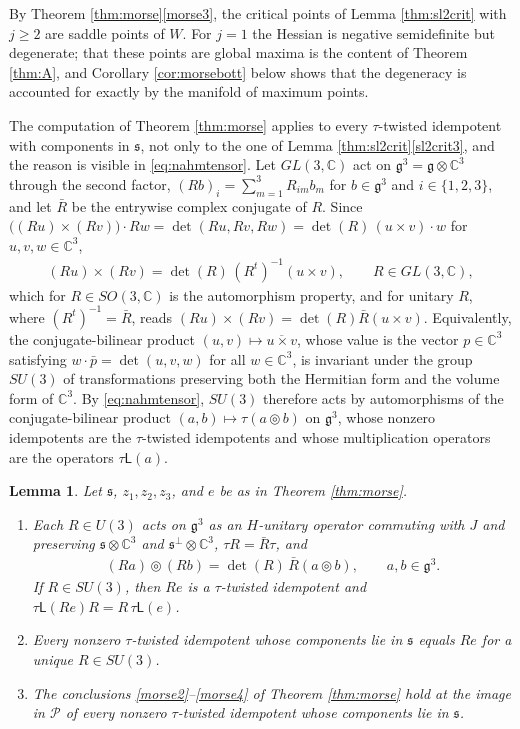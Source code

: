 \documentclass [leqno, 10pt]{amsart}
\newtheorem{lemma}[theorem]{Lemma}%
\theoremstyle{definition}
\numberwithin{equation}{section}
\newcommand{\tmlt}{\circledcirc}
\newcommand{\lin}{\mathsf{L}}
\newcommand{\g}{\mathfrak{g}}
\newcommand{\com}{\mathbb C}
\newcommand{\subs}{\mathfrak{s}}
\begin{document}
By Theorem \ref{thm:morse}\ref{morse3}, the critical points of Lemma \ref{thm:sl2crit} with $j \geq 2$ are saddle points of $W$. For $j = 1$ the Hessian is negative semidefinite but degenerate; that these points are global maxima is the content of Theorem \ref{thm:A}, and Corollary \ref{cor:morsebott} below shows that the degeneracy is accounted for exactly by the manifold of maximum points.

The computation of Theorem \ref{thm:morse} applies to every $\tau$-twisted idempotent with components in $\subs$, not only to the one of Lemma \ref{thm:sl2crit}\ref{sl2crit3}, and the reason is visible in \eqref{eq:nahmtensor}. Let $GL(3, \com)$ act on $\g^{3} = \g \otimes \com^{3}$ through the second factor, $(Rb)_{i} = \sum_{m=1}^{3}R_{im}b_{m}$ for $b \in \g^{3}$ and $i \in \{1, 2, 3\}$, and let $\bar{R}$ be the entrywise complex conjugate of $R$. Since $\big((Ru) \times (Rv)\big) \cdot Rw = \det(Ru, Rv, Rw) = \det(R)\,(u \times v)\cdot w$ for $u, v, w \in \com^{3}$,
\begin{align}\label{eq:crossequivariance}
(Ru) \times (Rv) = \det(R)\,(R^{t})^{-1}(u \times v), \qquad R \in GL(3, \com),
\end{align}
which for $R \in SO(3, \com)$ is the automorphism property, and for unitary $R$, where $(R^{t})^{-1} = \bar{R}$, reads $(Ru) \times (Rv) = \det(R)\bar{R}(u \times v)$. Equivalently, the conjugate-bilinear product $(u, v) \mapsto \overline{u \times v}$, whose value is the vector $p \in \com^{3}$ satisfying $w \cdot \bar{p} = \det(u, v, w)$ for all $w \in \com^{3}$, is invariant under the group $SU(3)$ of transformations preserving both the Hermitian form and the volume form of $\com^{3}$. By \eqref{eq:nahmtensor}, $SU(3)$ therefore acts by automorphisms of the conjugate-bilinear product $(a, b) \mapsto \tau(a \tmlt b)$ on $\g^{3}$, whose nonzero idempotents are the $\tau$-twisted idempotents and whose multiplication operators are the operators $\tau\lin(a)$.
\begin{lemma}\label{lem:rotation}
Let $\subs$, $z_{1}, z_{2}, z_{3}$, and $e$ be as in Theorem \ref{thm:morse}.
\begin{enumerate}[label=(\arabic*), ref=(\arabic*)]
\item\label{rot1} Each $R \in U(3)$ acts on $\g^{3}$ as an $H$-unitary operator commuting with $J$ and preserving $\subs\otimes\com^{3}$ and $\subs^{\perp}\otimes\com^{3}$, $\tau R = \bar{R}\tau$, and
\begin{align}\label{eq:rotation}
(Ra) \tmlt (Rb) = \det(R)\,\bar{R}(a \tmlt b), \qquad a, b \in \g^{3}.
\end{align}
If $R \in SU(3)$, then $Re$ is a $\tau$-twisted idempotent and $\tau\lin(Re)R = R\,\tau\lin(e)$.
\item\label{rot2} Every nonzero $\tau$-twisted idempotent whose components lie in $\subs$ equals $Re$ for a unique $R \in SU(3)$.
\item\label{rot3} The conclusions \ref{morse2}--\ref{morse4} of Theorem \ref{thm:morse} hold at the image in $\mathcal{P}$ of every nonzero $\tau$-twisted idempotent whose components lie in $\subs$.
\end{enumerate}
\end{lemma}
\end{document}
